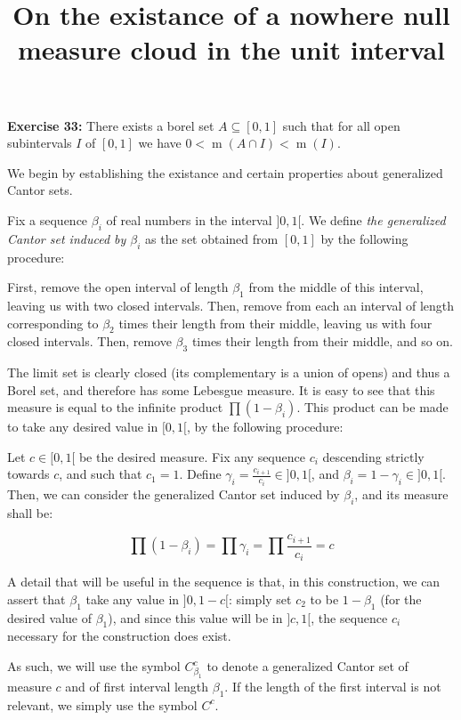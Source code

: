 \documentclass{article}
\title{On the existance of a nowhere null measure cloud in the unit interval}
\author{}
\date{}
\DeclareMathOperator{\m}{m}
\begin{document}
	\maketitle
	
	\textbf{Exercise 33:} There exists a borel set $A \subseteq [0,1]$ such that for all open subintervals $I$ of $[0,1]$ we have $0 < \m(A \cap I) < \m(I)$.
	
	\bigskip
	
	We begin by establishing the existance and certain properties about generalized Cantor sets.
	
	Fix a sequence $\beta_i$ of real numbers in the interval $]0,1[$. We define \emph{the generalized Cantor set induced by $\beta_i$} as the set obtained from $[0,1]$ by the following procedure:
	
	First, remove the open interval of length $\beta_1$ from the middle of this interval, leaving us with two closed intervals. Then, remove from each an interval of length corresponding to $\beta_2$ times their length from their middle, leaving us with four closed intervals. Then, remove $\beta_3$ times their length from their middle, and so on.
	
	The limit set is clearly closed (its complementary is a union of opens) and thus a Borel set, and therefore has some Lebesgue measure. It is easy to see that this measure is equal to the infinite product $\prod (1 - \beta_i)$. This product can be made to take any desired value in $[0, 1[$, by the following procedure:
	
	Let $c \in [0, 1[$ be the desired measure. Fix any sequence $c_i$ descending strictly towards $c$, and such that $c_1 = 1$. Define $\gamma_i = \frac{c_{i+1}}{c_i} \in ]0, 1[$, and $\beta_i = 1 - \gamma_i \in ]0,1[$. Then, we can consider the generalized Cantor set induced by $\beta_i$, and its measure shall be:
	
	\[ \prod (1 - \beta_i) = \prod \gamma_i = \prod \frac{c_{i+1}}{c_i} = c \]
	
	A detail that will be useful in the sequence is that, in this construction, we can assert that $\beta_1$ take any value in $]0, 1-c[$: simply set $c_2$ to be $1 - \beta_1$ (for the desired value of $\beta_1$), and since this value will be in $]c, 1[$, the sequence $c_i$ necessary for the construction does exist.
	
	As such, we will use the symbol $C^c_{\beta_1}$ to denote a generalized Cantor set of measure $c$ and of first interval length $\beta_1$. If the length of the first interval is not relevant, we simply use the symbol $C^c$.
	
\end{document}
